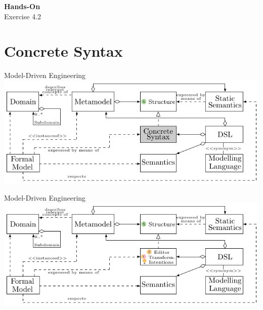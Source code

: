 	\begin{frame}
		\begin{center}
			\Huge \textbf{Hands-On}\\
			
			Exercise 4.2
		\end{center}
	\end{frame}

	\section{Concrete Syntax}
	
	\begin{frame}{Model-Driven Engineering}
		\includegraphics[width=\textwidth]{tikz/mdsd_concept_3.pdf}
	\end{frame}

	\begin{frame}[noframenumbering]{Model-Driven Engineering}
		\includegraphics[width=\textwidth]{tikz/mdsd_concept_4.pdf}
	\end{frame}

